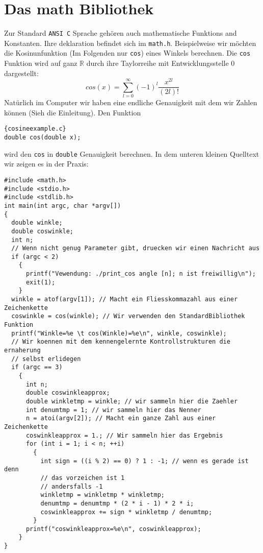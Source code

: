 \section{Das math Bibliothek}
Zur Standard \texttt{ANSI C} Sprache gehören auch mathematische Funktions and Konstanten.
Ihre deklaration befindet sich im \texttt{math.h}. Beispielweise wir möchten 
die Kosinunfunktion (Im Folgenden nur \texttt{cos}) eines Winkels berechnen.
Die \texttt{cos} Funktion wird auf ganz $\mathbb{R}$ durch ihre 
Taylorreihe mit Entwicklungsstelle 0 dargestellt:
\begin{equation}
cos\left(x\right)=\sum_{l=0}^{\infty} \left(-1\right)^{l} \dfrac{x^{2l}}{\left(2l\right)!}
\end{equation}
Natürlich im Computer wir haben eine endliche Genauigkeit mit dem wir Zahlen können
(Sieh die Einleitung). Den Funktion 
\begin{lstlisting}{cosineexample.c}
double cos(double x);
\end{lstlisting}
wird den \texttt{cos} in \texttt{double} Genauigkeit berechnen.
In dem unteren kleinen Quelltext wir zeigen es in der Praxis:
\begin{lstlisting}
#include <math.h>
#include <stdio.h>
#include <stdlib.h>
int main(int argc, char *argv[])
{
  double winkle;
  double coswinkle;
  int n;
  // Wenn nicht genug Parameter gibt, druecken wir einen Nachricht aus
  if (argc < 2)
    {
      printf("Vewendung: ./print_cos angle [n]; n ist freiwillig\n");
      exit(1);
    }
  winkle = atof(argv[1]); // Macht ein Fliesskommazahl aus einer Zeichenkette
  coswinkle = cos(winkle); // Wir verwenden den StandardBibliothek Funktion
  printf("Winkle=%e \t cos(Winkle)=%e\n", winkle, coswinkle);
  // Wir koennen mit dem kennengelernte Kontrollstrukturen die ernaherung
  // selbst erlidegen
  if (argc == 3)
    {
      int n;
      double coswinkleapprox;
      double winkletmp = winkle; // wir sammeln hier die Zaehler
      int denumtmp = 1; // wir sammeln hier das Nenner
      n = atoi(argv[2]); // Macht ein ganze Zahl aus einer Zeichenkette
      coswinkleapprox = 1.; // Wir sammeln hier das Ergebnis
      for (int i = 1; i < n; ++i)
        {
          int sign = ((i % 2) == 0) ? 1 : -1; // wenn es gerade ist denn
          // das vorzeichen ist 1
          // andersfalls -1
          winkletmp = winkletmp * winkletmp;
          denumtmp = denumtmp * (2 * i - 1) * 2 * i;
          coswinkleapprox += sign * winkletmp / denumtmp;
        }
      printf("coswinkleapprox=%e\n", coswinkleapprox);
    }
}
\end{lstlisting}

